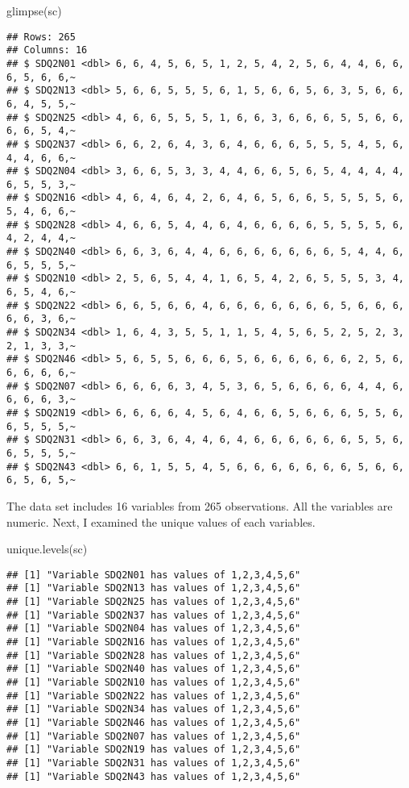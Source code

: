 \documentclass[
]{article}
\newenvironment{Shaded}{\begin{snugshade}}{\end{snugshade}}
\newcommand{\FunctionTok}[1]{\textcolor[rgb]{0.00,0.00,0.00}{#1}}
\newcommand{\NormalTok}[1]{#1}
\begin{document}
\begin{Shaded}
\begin{Highlighting}[]
\FunctionTok{glimpse}\NormalTok{(sc)}
\end{Highlighting}
\end{Shaded}

\begin{verbatim}
## Rows: 265
## Columns: 16
## $ SDQ2N01 <dbl> 6, 6, 4, 5, 6, 5, 1, 2, 5, 4, 2, 5, 6, 4, 4, 6, 6, 6, 5, 6, 6,~
## $ SDQ2N13 <dbl> 5, 6, 6, 5, 5, 5, 6, 1, 5, 6, 6, 5, 6, 3, 5, 6, 6, 6, 4, 5, 5,~
## $ SDQ2N25 <dbl> 4, 6, 6, 5, 5, 5, 1, 6, 6, 3, 6, 6, 6, 5, 5, 6, 6, 6, 6, 5, 4,~
## $ SDQ2N37 <dbl> 6, 6, 2, 6, 4, 3, 6, 4, 6, 6, 6, 5, 5, 5, 4, 5, 6, 4, 4, 6, 6,~
## $ SDQ2N04 <dbl> 3, 6, 6, 5, 3, 3, 4, 4, 6, 6, 5, 6, 5, 4, 4, 4, 4, 6, 5, 5, 3,~
## $ SDQ2N16 <dbl> 4, 6, 4, 6, 4, 2, 6, 4, 6, 5, 6, 6, 5, 5, 5, 5, 6, 5, 4, 6, 6,~
## $ SDQ2N28 <dbl> 4, 6, 6, 5, 4, 4, 6, 4, 6, 6, 6, 6, 5, 5, 5, 5, 6, 4, 2, 4, 4,~
## $ SDQ2N40 <dbl> 6, 6, 3, 6, 4, 4, 6, 6, 6, 6, 6, 6, 6, 5, 4, 4, 6, 6, 5, 5, 5,~
## $ SDQ2N10 <dbl> 2, 5, 6, 5, 4, 4, 1, 6, 5, 4, 2, 6, 5, 5, 5, 3, 4, 6, 5, 4, 6,~
## $ SDQ2N22 <dbl> 6, 6, 5, 6, 6, 4, 6, 6, 6, 6, 6, 6, 6, 5, 6, 6, 6, 6, 6, 3, 6,~
## $ SDQ2N34 <dbl> 1, 6, 4, 3, 5, 5, 1, 1, 5, 4, 5, 6, 5, 2, 5, 2, 3, 2, 1, 3, 3,~
## $ SDQ2N46 <dbl> 5, 6, 5, 5, 6, 6, 6, 5, 6, 6, 6, 6, 6, 6, 2, 5, 6, 6, 6, 6, 6,~
## $ SDQ2N07 <dbl> 6, 6, 6, 6, 3, 4, 5, 3, 6, 5, 6, 6, 6, 6, 4, 4, 6, 6, 6, 6, 3,~
## $ SDQ2N19 <dbl> 6, 6, 6, 6, 4, 5, 6, 4, 6, 6, 5, 6, 6, 6, 5, 5, 6, 6, 5, 5, 5,~
## $ SDQ2N31 <dbl> 6, 6, 3, 6, 4, 4, 6, 4, 6, 6, 6, 6, 6, 6, 5, 5, 6, 6, 5, 5, 5,~
## $ SDQ2N43 <dbl> 6, 6, 1, 5, 5, 4, 5, 6, 6, 6, 6, 6, 6, 6, 5, 6, 6, 6, 5, 6, 5,~
\end{verbatim}

The data set includes 16 variables from 265 observations. All the
variables are numeric. Next, I examined the unique values of each
variables.

\begin{Shaded}
\begin{Highlighting}[]
\FunctionTok{unique.levels}\NormalTok{(sc)}
\end{Highlighting}
\end{Shaded}

\begin{verbatim}
## [1] "Variable SDQ2N01 has values of 1,2,3,4,5,6"
## [1] "Variable SDQ2N13 has values of 1,2,3,4,5,6"
## [1] "Variable SDQ2N25 has values of 1,2,3,4,5,6"
## [1] "Variable SDQ2N37 has values of 1,2,3,4,5,6"
## [1] "Variable SDQ2N04 has values of 1,2,3,4,5,6"
## [1] "Variable SDQ2N16 has values of 1,2,3,4,5,6"
## [1] "Variable SDQ2N28 has values of 1,2,3,4,5,6"
## [1] "Variable SDQ2N40 has values of 1,2,3,4,5,6"
## [1] "Variable SDQ2N10 has values of 1,2,3,4,5,6"
## [1] "Variable SDQ2N22 has values of 1,2,3,4,5,6"
## [1] "Variable SDQ2N34 has values of 1,2,3,4,5,6"
## [1] "Variable SDQ2N46 has values of 1,2,3,4,5,6"
## [1] "Variable SDQ2N07 has values of 1,2,3,4,5,6"
## [1] "Variable SDQ2N19 has values of 1,2,3,4,5,6"
## [1] "Variable SDQ2N31 has values of 1,2,3,4,5,6"
## [1] "Variable SDQ2N43 has values of 1,2,3,4,5,6"
\end{verbatim}
\end{document}
